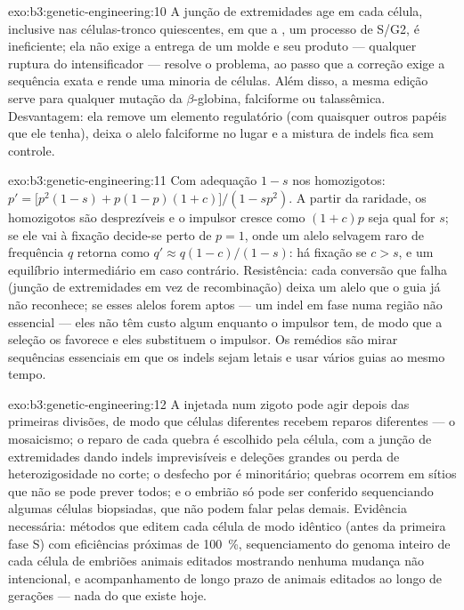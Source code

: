 \begin{solution}{exo:b3:genetic-engineering:10}
A junção de extremidades age em cada célula, inclusive nas
células-tronco quiescentes, em que a , um processo
de S/G2, é ineficiente; ela não exige a entrega de um molde e seu
produto --- qualquer ruptura do intensificador --- resolve o problema,
ao passo que a correção exige a sequência exata e rende uma minoria de
células. Além disso, a mesma edição serve para qualquer mutação da
$\beta$-globina, falciforme ou talassêmica. Desvantagem: ela remove um
elemento regulatório (com quaisquer outros papéis que ele tenha), deixa
o alelo falciforme no lugar e a mistura de indels fica sem controle.
\end{solution}

\begin{solution}{exo:b3:genetic-engineering:11}
Com adequação $1 - s$ nos homozigotos: $p' = \bigl[p^{2}(1-s) + p(1-p)(1+c)
\bigr]/(1 - sp^{2})$. A partir da raridade, os homozigotos
são desprezíveis e o impulsor cresce como $(1+c)p$ seja qual for $s$;
se ele vai à fixação decide-se perto de $p = 1$, onde um alelo
selvagem raro de frequência $q$ retorna como
$q' \approx q(1-c)/(1-s)$: há fixação se $c > s$, e um equilíbrio
intermediário em caso contrário. Resistência: cada conversão que falha
(junção de extremidades em vez de recombinação) deixa um alelo que o
guia já não reconhece; se esses alelos forem aptos --- um indel em fase
numa região não essencial --- eles não têm custo algum enquanto o
impulsor tem, de modo que a seleção os favorece e eles substituem o
impulsor. Os remédios são mirar sequências essenciais em que os indels
sejam letais e usar vários guias ao mesmo tempo.
\end{solution}

\begin{solution}{exo:b3:genetic-engineering:12}
A  injetada num zigoto pode agir depois das primeiras divisões, de
modo que células diferentes recebem reparos diferentes --- o mosaicismo;
o reparo de cada quebra é escolhido pela célula, com a junção de
extremidades dando indels imprevisíveis e deleções grandes ou perda de
heterozigosidade no corte; o desfecho por  é
minoritário; quebras  ocorrem em sítios que não se pode
prever todos; e o embrião só pode ser conferido sequenciando algumas
células biopsiadas, que não podem falar pelas demais. Evidência
necessária: métodos que editem cada célula de modo idêntico (antes da
primeira fase S) com eficiências próximas de \qty{100}{\%},
sequenciamento do genoma inteiro de cada célula de embriões animais
editados mostrando nenhuma mudança não intencional, e acompanhamento de
longo prazo de animais editados ao longo de gerações --- nada do que
existe hoje.
\end{solution}

